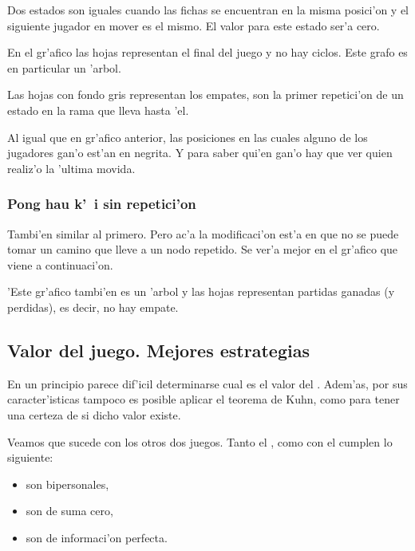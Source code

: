 Dos estados son iguales cuando las fichas se encuentran en la misma posici'on y el siguiente jugador en mover es el mismo. El valor para este estado ser'a cero.

En el gr'afico las hojas representan el final del juego y no hay ciclos. Este grafo es en particular un 'arbol.

Las hojas con fondo gris representan los empates, son la primer repetici'on de un estado en la rama que lleva hasta 'el.

Al igual que en gr'afico anterior, las posiciones en las cuales alguno de los jugadores gan'o est'an en negrita. Y para saber qui'en gan'o hay que ver quien realiz'o la 'ultima movida.

\clearpage

\subsubsection{Pong hau k'\ i sin repetici'on}

Tambi'en similar al primero. Pero ac'a la modificaci'on est'a en que no se puede tomar un camino que lleve a un nodo repetido. Se ver'a mejor en el gr'afico que viene a continuaci'on.

'Este gr'afico tambi'en es un 'arbol y las hojas representan partidas ganadas (y perdidas), es decir, no hay empate.

\clearpage


\subsection{Valor del juego. Mejores estrategias}
En un principio parece dif'icil determinarse cual es el valor del . Adem'as, por sus caracter'isticas tampoco es posible aplicar el teorema de Kuhn, como para tener una certeza de si dicho valor existe.

Veamos que sucede con los otros dos juegos. Tanto el , como con el  cumplen lo siguiente:

\begin{itemize}
\item son bipersonales,
\item son de suma cero,
\item son de informaci'on perfecta.
\end{itemize}

